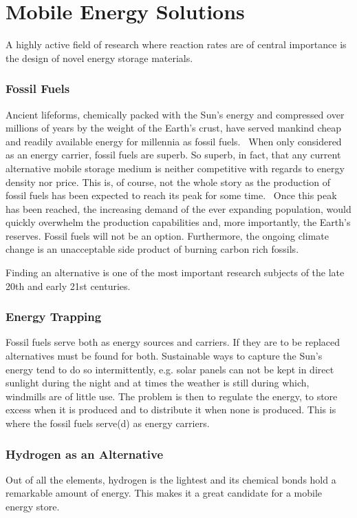 \section{Mobile Energy Solutions}
A highly active field of research where reaction rates are of central importance is the design of novel energy storage materials.

\subsubsection{Fossil Fuels}
Ancient lifeforms, chemically packed with the Sun's energy and compressed over millions of years by the weight of the Earth's crust, have served mankind cheap and readily available energy for millennia as fossil fuels.~\cite{early-oil-use}
When only considered as an energy carrier, fossil fuels are superb.
So superb, in fact, that any current alternative mobile storage medium is neither competitive with regards to energy density nor price. 
This is, of course, not the whole story as the production of fossil fuels has been expected to reach its peak for some time.~\citemiss
Once this peak has been reached, the increasing demand of the ever expanding population, would quickly overwhelm the production capabilities and, more importantly, the Earth's reserves.
Fossil fuels will not be an option.
Furthermore, the ongoing climate change is an unacceptable side product of burning carbon rich fossils.~\citemiss

Finding an alternative is one of the most important research subjects of the late 20th and early 21st centuries.

\subsubsection{Energy Trapping}
Fossil fuels serve both as energy sources and carriers.
If they are to be replaced alternatives must be found for both.
Sustainable ways to capture the Sun's energy tend to do so intermittently, e.g. solar panels can not be kept in direct sunlight during the night and at times the weather is still during which, windmills are of little use.
The problem is then to regulate the energy, to store excess when it is produced and to distribute it when none is produced.
This is where the fossil fuels serve(d) as energy carriers.

\subsubsection{Hydrogen as an Alternative}
Out of all the elements, hydrogen is the lightest and its chemical bonds hold a remarkable amount of energy.
This makes it a great candidate for a mobile energy store.

